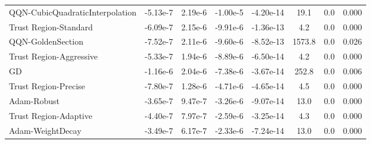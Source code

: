 \documentclass{article}
\begin{document}
\begin{table}[htbp]
{\begin{tabular}{p{2.5cm}*{7}{c}}
QQN-CubicQuadraticInterpolation & -5.13e-7 & 2.19e-6 & -1.00e-5 & -4.20e-14 & 19.1 & 0.0 & 0.000 \\
Trust Region-Standard & -6.09e-7 & 2.15e-6 & -9.91e-6 & -1.36e-13 & 4.2 & 0.0 & 0.000 \\
QQN-GoldenSection & -7.52e-7 & 2.11e-6 & -9.60e-6 & -8.52e-13 & 1573.8 & 0.0 & 0.026 \\
Trust Region-Aggressive & -5.33e-7 & 1.94e-6 & -8.89e-6 & -6.50e-14 & 4.2 & 0.0 & 0.000 \\
GD & -1.16e-6 & 2.04e-6 & -7.38e-6 & -3.67e-14 & 252.8 & 0.0 & 0.006 \\
Trust Region-Precise & -7.80e-7 & 1.28e-6 & -4.71e-6 & -4.65e-14 & 4.5 & 0.0 & 0.000 \\
Adam-Robust & -3.65e-7 & 9.47e-7 & -3.26e-6 & -9.07e-14 & 13.0 & 0.0 & 0.000 \\
Trust Region-Adaptive & -4.40e-7 & 7.97e-7 & -2.59e-6 & -3.25e-14 & 4.3 & 0.0 & 0.000 \\
Adam-WeightDecay & -3.49e-7 & 6.17e-7 & -2.33e-6 & -7.24e-14 & 13.0 & 0.0 & 0.000 \\
\bottomrule
\end{tabular}
}
\end{table}
\end{document}
